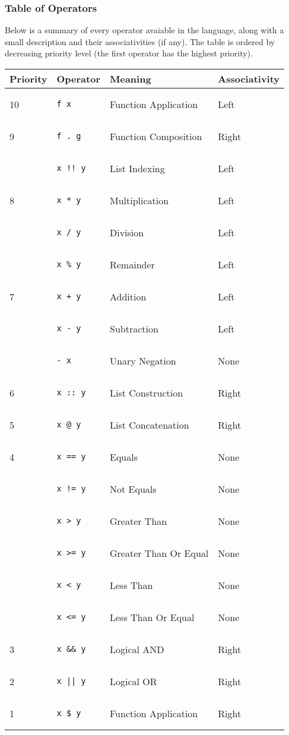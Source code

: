 \documentclass{article}
\def\code#1{\begin{footnotesize}\texttt{#1}\end{footnotesize}}
\begin{document}
\subsubsection{Table of Operators}

Below is a summary of every operator avaiable in the language, along with a small description and their associativities (if any).
The table is ordered by decreasing priority level (the first operator has the highest priority).

\medskip

\begin{tabular}{|l|l|l|l|}
  \hline
  \textbf{Priority} & \textbf{Operator} & \textbf{Meaning} & \textbf{Associativity}\\
  \hline
  10 & \code{f x} & Function Application & Left\\
  \hline
  9 & \code{f . g} & Function Composition & Right\\
  \hline
   & \code{x !! y} & List Indexing & Left\\
  \hline
  8 & \code{x * y} & Multiplication & Left\\
  \hline
   & \code{x / y} & Division & Left\\
  \hline
   & \code{x \% y} & Remainder & Left\\
  \hline
  7 & \code{x + y} & Addition & Left\\
  \hline
   & \code{x - y} & Subtraction & Left\\
  \hline
   & \code{- x} & Unary Negation & None\\
  \hline
  6 & \code{x :: y} & List Construction & Right\\
  \hline
  5 & \code{x @ y} & List Concatenation & Right\\
  \hline
  4 & \code{x == y} & Equals & None\\
  \hline
   & \code{x != y} & Not Equals & None\\
  \hline
   & \code{x > y} & Greater Than & None\\
  \hline
   & \code{x >= y} & Greater Than Or Equal & None\\
  \hline
   & \code{x < y} & Less Than & None\\
  \hline
   & \code{x <= y} & Less Than Or Equal & None\\
  \hline
  3 & \code{x \&\& y} & Logical AND & Right\\
  \hline
  2 & \code{x || y} & Logical OR & Right\\
  \hline
  1 & \code{x \$ y} & Function Application & Right\\
  \hline
\end{tabular}
\end{document}
